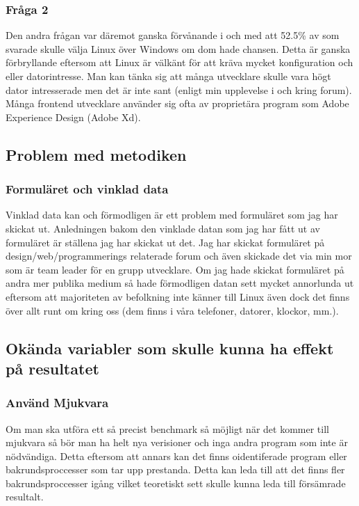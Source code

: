 \documentclass[12pt, a4paper]{report}
\begin{document}
\subsubsection{Fråga 2}
Den andra frågan var däremot ganska förvånande i och med att 52.5\% av som svarade skulle välja Linux över Windows om dom hade chansen. Detta är ganska förbryllande eftersom att Linux är välkänt för att kräva mycket konfiguration och eller datorintresse. Man kan tänka sig att många utvecklare skulle vara högt dator intresserade men det är inte sant (enligt min upplevelse i och kring forum). Många frontend utvecklare använder sig ofta av proprietära program som Adobe Experience Design (Adobe Xd). 

\subsection{Problem med metodiken}

\subsubsection{Formuläret och vinklad data}

Vinklad data kan och förmodligen är ett problem med formuläret som jag har skickat ut. Anledningen bakom den vinklade datan som jag har fått ut av formuläret är ställena jag har skickat ut det. Jag har skickat formuläret på design/web/programmerings relaterade forum och även skickade det via min mor som är team leader för en grupp utvecklare. Om jag hade skickat formuläret på andra mer publika medium så hade förmodligen datan sett mycket annorlunda ut eftersom att majoriteten av befolkning inte känner till Linux även dock det finns över allt runt om kring oss (dem finns i våra telefoner, datorer, klockor, mm.). 

\subsection{Okända variabler som skulle kunna ha effekt på resultatet}


\subsubsection{Använd Mjukvara}

Om man ska utföra ett så precist benchmark så möjligt när det kommer till mjukvara så bör man ha helt nya verisioner och inga andra program som inte är nödvändiga. Detta eftersom att annars kan det finns oidentiferade program eller bakrundsproccesser som tar upp prestanda. Detta kan leda till att det finns fler bakrundsproccesser igång vilket teoretiskt sett skulle kunna leda till försämrade resultalt.
\end{document}
